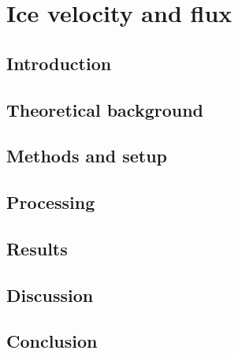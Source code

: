 

\renewcommand{\chapterauthor}{Julien, Linda Thielke, Moritz Bitterling}
\chapter{Ice velocity and flux}
\label{icevel}

\begin{abstract}

\end{abstract}


\section{Introduction}


\section{Theoretical background} \label{GPS:sec:Theoretical backround}


\section{Methods and setup} \label{GPS:sec:Methods and setup}


\section{Processing} \label{GPS:sec:Processing}


\section{Results} \label{GPS:sec:Results}


\section{Discussion} \label{GPS:sec:Discussion}


\section{Conclusion}




